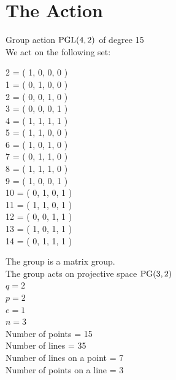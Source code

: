 \section*{The Action}
Group action ${\rm PGL}(4,2)$ of degree 15\\
We act on the following set:\\
\begin{multicols}{2}
 = ( 1, 0, 0, 0 )\\
1 = ( 0, 1, 0, 0 )\\
2 = ( 0, 0, 1, 0 )\\
3 = ( 0, 0, 0, 1 )\\
4 = ( 1, 1, 1, 1 )\\
5 = ( 1, 1, 0, 0 )\\
6 = ( 1, 0, 1, 0 )\\
7 = ( 0, 1, 1, 0 )\\
8 = ( 1, 1, 1, 0 )\\
9 = ( 1, 0, 0, 1 )\\
10 = ( 0, 1, 0, 1 )\\
11 = ( 1, 1, 0, 1 )\\
12 = ( 0, 0, 1, 1 )\\
13 = ( 1, 0, 1, 1 )\\
14 = ( 0, 1, 1, 1 )\\
\end{multicols}
The group is a matrix group.\\
The group acts on projective space ${\rm PG}(3, 2)$\\
$q = 2$\\
$p = 2$\\
$e = 1$\\
$n = 3$\\
Number of points = 15\\
Number of lines = 35\\
Number of lines on a point = 7\\
Number of points on a line = 3\\
